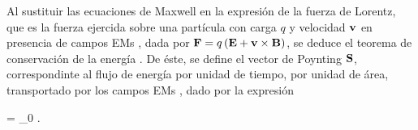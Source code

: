 
Al sustituir las ecuaciones de Maxwell en la expresión de la fuerza de Lorentz, que es la fuerza ejercida sobre una partícula con carga $q$ y velocidad $\vb{v}$ en presencia de campos EMs \cite{griffiths2013electrodynamics}, dada por $	\vb{F} = q \left( \vb{E} + \vb{v}\times \vb{B} \right)$, se deduce el teorema de  conservación de la energía \cite{griffiths2013electrodynamics}. De éste, se define el vector de Poynting $\vb{S}$, correspondinte al flujo de energía por unidad de tiempo, por unidad de área, transportado por los campos EMs \cite{griffiths2013electrodynamics}, dado por la expresión  \vspace*{-.5em}
	\begin{tcolorbox}[title = Vector de Poynting, ams align]
	 = _0 \times{}.  \label{eq:Poynting}
	\end{tcolorbox}

